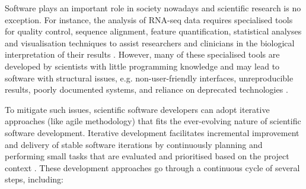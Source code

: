 Software plays an important role in society nowadays and scientific research is no exception. For instance, the analysis of RNA-seq data requires specialised tools for quality control, sequence alignment, feature quantification, statistical analyses and visualisation techniques to assist researchers and clinicians in the biological interpretation of their results \cite{conesa:2016vw}. However, many of these specialised tools are developed by scientists with little programming knowledge and may lead to software with structural  issues, e.g. non-user-friendly interfaces, unreproducible results, poorly documented systems, and reliance on deprecated technologies \cite{storer:2017tr,silva:2017wl}.


To mitigate such issues, scientific software developers can adopt iterative approaches (like agile methodology) that fits the ever-evolving nature of scientific software development. Iterative development facilitates incremental improvement and delivery of stable software iterations by continuously planning and performing small tasks that are evaluated and prioritised based on the project context \cite{storer:2017tr,silva:2017wl,dyba:2009tc}. These development approaches go through a continuous cycle of several steps, including:

